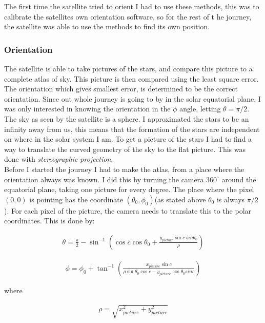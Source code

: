 \documentclass[a4paper, 10pt]{article}
\begin{document}
The first time the satellite tried to orient I had to use these methods, this was to calibrate the satellites own orientation software, so for the rest of t he journey, the satellite was able to use the methods to find its own position.

\subsubsection{Orientation}
The satellite is able to take pictures of the stars, and compare this picture to a complete atlas of sky. This picture is then compared using the least square error. The orientation which gives smallest error, is determined to be the correct orientation. Since out whole journey is going to by in the solar equatorial plane, I was only interested in knowing the orientation in the $\phi$ angle, letting $\theta = \pi /2$.\\

The sky as seen by the satellite is a sphere. I approximated the stars to be an infinity away from us, this means that the formation of the stars are independent on where in the solar system I am. To get a picture of the stars I had to find a way to translate the curved geometry of the sky to the flat picture. This was done with \textit{stereographic projection}\cite{part4}.\\

Before I started the journey I had to make the atlas, from a place where the orientation always was known. I did this by turning the camera $360^\circ$ around the equatorial plane, taking one picture for every degree. The place where the pixel $(0,0)$ is pointing has the coordinate $(\theta_0,\phi_0)$(as stated above $\theta_0$ is always $\pi/2$). For each pixel of the picture, the camera needs to translate this to the polar coordinates. This is done by: 

\begin{align}
\theta = \frac{\pi}{2} - \sin^{-1}\left( \cos c \cos \theta_0 + \frac{y_{picture}\sin c\ sin \theta_0}{\rho} \right)
\end{align}

\begin{align}
\phi = \phi_0 + \tan^{-1} \left( \frac{x_{picture}\sin c}{\rho \sin \theta_0 \cos c - y_{picture}\cos \theta_0 sin c} \right)
\end{align}

where 

\begin{align}
\rho = \sqrt{x_{picture}^2 + y_{picture}^2}
\end{align}
\end{document}
